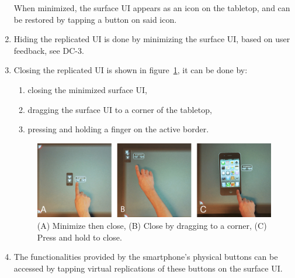 \begin{enumerate}[{DD}-1]
When minimized, the surface UI appears as an icon on the tabletop, and can be restored by tapping a button on said icon.
\item Hiding the replicated UI is done by minimizing the surface UI, based on user feedback, see DC-3.
\item Closing the replicated UI is shown in figure~\ref{fig:sqClose}, it can be done by:
	\begin{enumerate}[1{.}]
	\item closing the minimized surface UI,
	\item dragging the surface UI to a corner of the tabletop,
	\item pressing and holding a finger on the active border.
	\end{enumerate}

\begin{figure}[htb]
  \centering
    \includegraphics[width=0.7\linewidth]{images/sqClose}
  \caption{(A) Minimize then close, (B) Close by dragging to a corner, (C) Press and hold to close.}
  \label{fig:sqClose}
\end{figure}

\item The functionalities provided by the smartphone's physical buttons can be accessed by tapping virtual replications of these buttons on the surface UI.
\end{enumerate}

\firmlists


